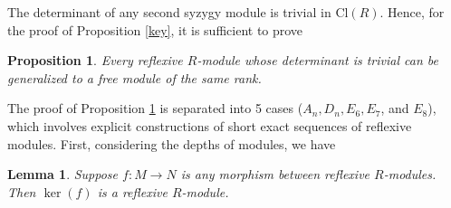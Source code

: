 \documentclass{amsart}[12pt]
\newtheorem{lemma}[theorem]{Lemma}
\newtheorem{prop}[theorem]{Proposition}
\theoremstyle{definition}
\theoremstyle{remark}
\numberwithin{equation}{section}
\begin{document}
The determinant of any second syzygy module is trivial in $\mathrm{Cl}(R)$. Hence, for the proof of Proposition \ref{key}, it is sufficient to prove

\begin{prop}\label{keyy}
Every reflexive $R$-module whose determinant is trivial can be generalized to a free module of the same rank.
\end{prop}

The proof of Proposition \ref{keyy} is separated into 5 cases ($A_n, D_n, E_6, E_7$, and $E_8$), which involves explicit constructions of short exact sequences of reflexive modules. First, considering the depths of modules, we have

\begin{lemma}\label{injective}\cite[Part II. Lemma 1.1(c)]{AR89}
Suppose $f: M \to N$ is any morphism between reflexive $R$-modules. Then $\ker(f)$ is a reflexive $R$-module.
\end{lemma}
\end{document}

